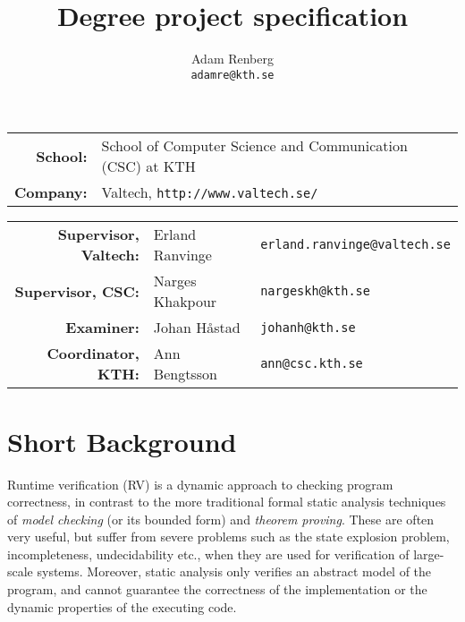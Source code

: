 \documentclass[a4paper,11pt]{article}
\begin{document}
\setlength\parindent{0em}
\setlength\parskip{1em}


\title{Degree project specification}
\author{Adam Renberg\\\texttt{adamre@kth.se}}

\maketitle

\begin{tabular}{rll}
	\textbf{School:}  & School of Computer Science and Communication (CSC) at KTH \\
    \textbf{Company:} & Valtech, \texttt{http://www.valtech.se/} \\
\end{tabular}

\begin{tabular}{rll}
	\textbf{Supervisor, Valtech:} & Erland Ranvinge & \texttt{erland.ranvinge@valtech.se} \\
    \textbf{Supervisor, CSC:}     & Narges Khakpour & \texttt{nargeskh@kth.se} \\
    \textbf{Examiner:}		  & Johan Håstad	& \texttt{johanh@kth.se} \\
    \textbf{Coordinator, KTH:}	  & Ann Bengtsson & \texttt{ann@csc.kth.se} \\
\end{tabular}


\begin{spacing}{0.9}
\setlength\parskip{0.1em}
\tableofcontents
\end{spacing}

\section{Short Background}

Runtime verification (RV) is a dynamic approach to checking program correctness, in contrast to the more 
traditional formal static analysis techniques of \emph{model checking} (or its
bounded form) and \emph{theorem proving}. These are often very useful, but suffer from severe problems such as the
state explosion problem, incompleteness, undecidability etc.,
when they are used for verification of large-scale systems.
Moreover, static analysis only verifies an abstract model of the program, and cannot guarantee the correctness of the implementation or the dynamic properties of the executing code.
\end{document}
